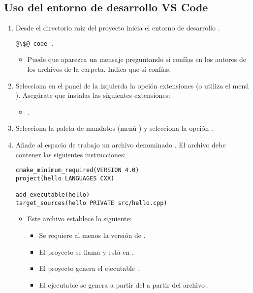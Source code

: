 \subsection{Uso del entorno de desarrollo \textbf{VS Code}}

\begin{enumerate}

\item Desde el directorio raíz del proyecto inicia el entorno de desarrollo
.

\begin{lstlisting}[style=terminal,escapechar=@]
@\$@ code .
\end{lstlisting}

  \begin{itemize}
    \item Puede que aparezca un mensaje preguntando si confías en los
          autores de los archivos de la carpeta. Indica que sí confías.
  \end{itemize}

\item
Selecciona en el panel de la izquierda la opción extensiones (o utiliza el menú
). Asegúrate que instalas las siguientes extensiones:

  \begin{itemize}
    \item {}.
  \end{itemize}

\item
Selecciona la paleta de mandatos (menú ) y
selecciona la opción .

\item
Añade al espacio de trabajo un archivo denominado . El
archivo debe contener las siguientes instrucciones:

\begin{lstlisting}
cmake_minimum_required(VERSION 4.0)
project(hello LANGUAGES CXX)

add_executable(hello)
target_sources(hello PRIVATE src/hello.cpp)
\end{lstlisting}

  \begin{itemize}
    \item Este archivo establece lo siguiente:
      \begin{itemize}
        \item Se requiere al menos la versión  de .
        \item El proyecto se llama  y está en .
        \item El proyecto genera el ejecutable .
        \item El ejecutable  se genera a partir del 
              a partir del archivo .
      \end{itemize}
  \end{itemize}


\end{enumerate}
